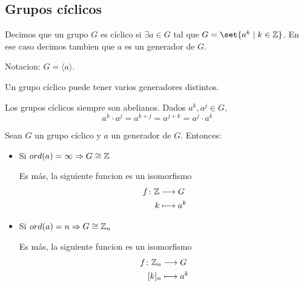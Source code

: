 \subsection{Grupos cíclicos}
\begin{definition}
	Decimos que un grupo \(G \) es cíclico si \(\exists a \in G \) tal que \(G = \set{a^{k} \mid k \in \Z }\). En ese caso decimos tambien que \(a \) es un generador de \(G \).
	
	Notacion: \(G = \langle a \rangle \).
\end{definition}
\begin{remark}
	Un grupo cíclico puede tener varios generadores distintos.
\end{remark}
\begin{remark}
	Los grupos cíclicos siempre son abelianos. Dados \(a^{k}, a^{j} \in G  \),
	\[
		a^{k} \cdot a^{j} = a^{k + j} = a^{j + k} = a^{j} \cdot a^{k}
	\]
\end{remark}
\begin{proposition}
	Sean \(G \) un grupo cíclico y \(a \) un generador de \(G \). Entonces:
	\begin{itemize}
		\item Si \(ord(a) = \infty \Rightarrow G \cong \mathbb{Z} \)
		      
		      Es más, la siguiente funcion es un isomorfismo
		      \[
			      \begin{aligned}
				      f \colon \mathbb{Z} & \longrightarrow G \\
				      k           & \longmapsto a^{k}
			      \end{aligned}
		      \]
		\item Si \(ord(a) = n \Rightarrow G \cong \mathbb{Z}_n \)
		      
		      Es más, la siguiente funcion es un isomorfismo
		      \[
			      \begin{aligned}
				      f \colon \mathbb{Z}_n & \longrightarrow G \\
				      [k]_n         & \longmapsto a^{k}
			      \end{aligned}
		      \]
		      
	\end{itemize}
\end{proposition}
